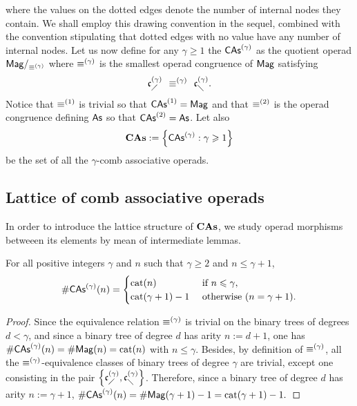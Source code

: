 where the values on the dotted edges denote the number of internal
nodes they contain. We shall employ this drawing convention in the
sequel, combined with the convention stipulating that dotted edges
with no value have any number of internal nodes. Let us now define for
any $\gamma \geq 1$ the 
$\mathsf{CAs}^{\left(\gamma\right)}$ as the quotient operad $\mathsf{Mag}/_{\operatorname{\equiv}^{(\gamma)}}$ where
$\operatorname{\equiv}^{(\gamma)}$ is the smallest operad congruence of $\mathsf{Mag}$
satisfying
\begin{equation} \label{equ:congruence_CAs_gamma}
    \mathfrak{c}^{\left(\gamma\right)}_{\diagup} \enspace \operatorname{\equiv}^{(\gamma)} \enspace \mathfrak{c}^{\left(\gamma\right)}_{\diagdown}.
\end{equation}
Notice that $\operatorname{\equiv}^{(1)}$ is trivial so that
$\mathsf{CAs}^{\left(1\right)} = \mathsf{Mag}$ and that $\operatorname{\equiv}^{(2)}$ is the operad congruence
defining $\mathsf{As}$ so that $\mathsf{CAs}^{\left(2\right)} = \mathsf{As}$. Let also
\begin{equation}
    \mathbf{CAs} := \left\{\mathsf{CAs}^{\left(\gamma\right)} : \gamma\geqslant 1\right\}
\end{equation}
be the set of all the $\gamma$-comb associative operads.
\medbreak

\subsection{Lattice of comb associative operads}

In order to introduce the lattice structure of $\mathbf{CAs}$, we study operad
morphisms betweeen its elements by mean of intermediate lemmas.

\begin{Lemma} \label{lem:first_dimensions_CAs}
    For all positive integers $\gamma$ and $n$ such that $\gamma \geq 2$
    and $n \leq \gamma + 1$,
    \begin{equation}
        \# \mathsf{CAs}^{\left(\gamma\right)}(n) =
        \begin{cases}
            \mathrm{cat}(n)
                & \mbox{ if } n \leqslant \gamma, \\
            \mathrm{cat}(\gamma + 1) - 1
                & \mbox{ otherwise } (n = \gamma + 1).
        \end{cases}
    \end{equation}
\end{Lemma}
\begin{proof}
    Since the equivalence relation $\operatorname{\equiv}^{(\gamma)}$ is trivial on the
    binary trees of degrees $d < \gamma$, and since a binary tree of
    degree $d$ has arity $n := d + 1$, one has
    $\# \mathsf{CAs}^{\left(\gamma\right)}(n) = \# \mathsf{Mag}(n) = \mathrm{cat}(n)$ with $n \leq \gamma$.
    Besides, by definition of $\operatorname{\equiv}^{(\gamma)}$, all the
    $\operatorname{\equiv}^{(\gamma)}$-equivalence classes of binary trees of degree
    $\gamma$ are trivial, except one consisting in the pair
    $\left\{\mathfrak{c}^{\left(\gamma\right)}_{\diagup}, \mathfrak{c}^{\left(\gamma\right)}_{\diagdown}\right\}$. Therefore, since a
    binary tree of degree $d$ has arity $n := \gamma + 1$,
    \begin{math}
        \# \mathsf{CAs}^{\left(\gamma\right)}(n)
        = \# \mathsf{Mag}(\gamma + 1) - 1
        = \mathrm{cat}(\gamma + 1) - 1.
    \end{math}
\end{proof}
\medbreak


